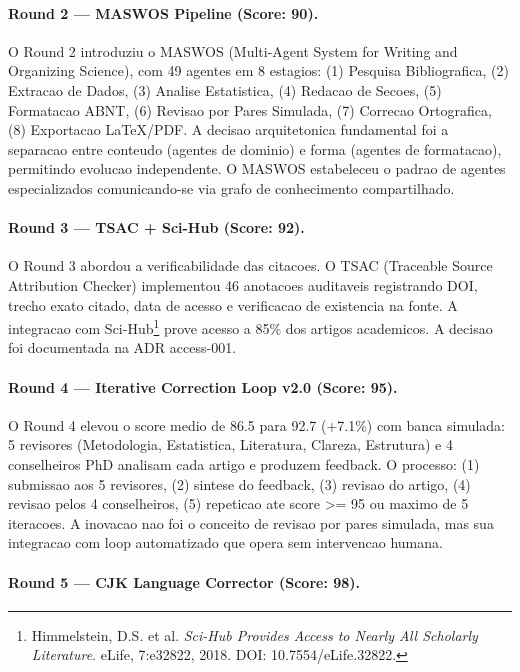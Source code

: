 \paragraph{Round 2 --- MASWOS Pipeline (Score: 90).}

O Round 2 introduziu o MASWOS (Multi-Agent System for Writing and
Organizing Science), com 49 agentes em 8 estagios: (1) Pesquisa
Bibliografica, (2) Extracao de Dados, (3) Analise Estatistica, (4)
Redacao de Secoes, (5) Formatacao ABNT, (6) Revisao por Pares Simulada,
(7) Correcao Ortografica, (8) Exportacao LaTeX/PDF. A decisao
arquitetonica fundamental foi a separacao entre conteudo (agentes de
dominio) e forma (agentes de formatacao), permitindo evolucao
independente. O MASWOS estabeleceu o padrao de agentes especializados
comunicando-se via grafo de conhecimento compartilhado.

\paragraph{Round 3 --- TSAC + Sci-Hub (Score: 92).}

O Round 3 abordou a verificabilidade das citacoes. O TSAC (Traceable
Source Attribution Checker) implementou 46 anotacoes auditaveis
registrando DOI, trecho exato citado, data de acesso e verificacao de
existencia na fonte. A integracao com Sci-Hub\footnote{Himmelstein, D.S.
et al. \textit{Sci-Hub Provides Access to Nearly All Scholarly Literature}.
eLife, 7:e32822, 2018. DOI: 10.7554/eLife.32822.} prove acesso a 85\%
dos artigos academicos. A decisao foi documentada na ADR access-001.

\paragraph{Round 4 --- Iterative Correction Loop v2.0 (Score: 95).}

O Round 4 elevou o score medio de 86.5 para 92.7 (+7.1\%) com banca
simulada: 5 revisores (Metodologia, Estatistica, Literatura, Clareza,
Estrutura) e 4 conselheiros PhD analisam cada artigo e produzem feedback.
O processo: (1) submissao aos 5 revisores, (2) sintese do feedback,
(3) revisao do artigo, (4) revisao pelos 4 conselheiros, (5) repeticao
ate score >= 95 ou maximo de 5 iteracoes. A inovacao nao foi o conceito
de revisao por pares simulada, mas sua integracao com loop automatizado
que opera sem intervencao humana.

\paragraph{Round 5 --- CJK Language Corrector (Score: 98).}

